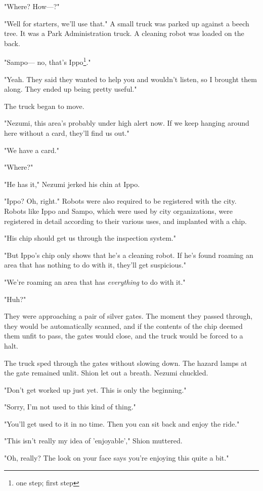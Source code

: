 "Where? How---?"

"Well for starters, we'll use that." A small truck was parked up against
a beech tree. It was a Park Administration truck. A cleaning robot was
loaded on the back.

"Sampo--- no, that's Ippo\footnote{one step; first step}."

"Yeah. They said they wanted to help you and wouldn't listen, so I
brought them along. They ended up being pretty useful."

The truck began to move.

"Nezumi, this area's probably under high alert now. If we keep hanging
around here without a card, they'll find us out."

"We have a card."

"Where?"

"He has it," Nezumi jerked his chin at Ippo.

"Ippo? Oh, right." Robots were also required to be registered with the
city. Robots like Ippo and Sampo, which were used by city organizations,
were registered in detail according to their various uses, and implanted
with a chip.

"His chip should get us through the inspection system."

"But Ippo's chip only shows that he's a cleaning robot. If he's found
roaming an area that has nothing to do with it, they'll get suspicious."

"We're roaming an area that has \emph{everything} to do with it."

"Huh?"

They were approaching a pair of silver gates. The moment they passed
through, they would be automatically scanned, and if the contents of the
chip deemed them unfit to pass, the gates would close, and the truck
would be forced to a halt.

The truck sped through the gates without slowing down. The hazard lamps
at the gate remained unlit. Shion let out a breath. Nezumi chuckled.

"Don't get worked up just yet. This is only the beginning."

"Sorry, I'm not used to this kind of thing."

"You'll get used to it in no time. Then you can sit back and enjoy the
ride."

"This isn't really my idea of 'enjoyable'," Shion muttered.

"Oh, really? The look on your face says you're enjoying this quite a
bit."

